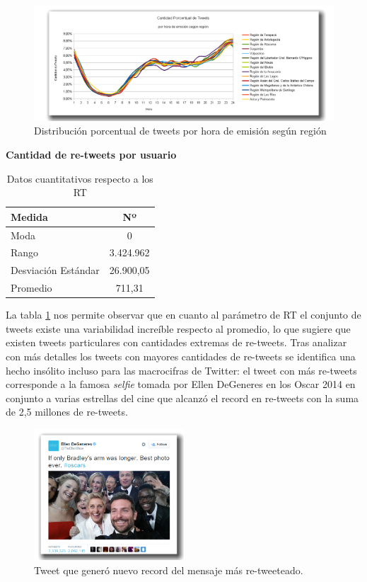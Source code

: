 \begin{figure}[H]
	\centering
	\includegraphics[width=1\textwidth]{imgs/cantidad_porcentual_de_tweets_por_hora_y_regiones.png}
	\caption{Distribución porcentual de tweets por hora de emisión según región}
	\label{fig:tweets_porcentual_por_hora_por_region}
\end{figure}



\textbf{Cantidad de re-tweets por usuario} \\

\begin{table}[H]
	\centering
	\begin{tabular}{| l | c |}
		\hline
		Medida   & Nº\\ \hline 
		Moda    & 0 \\ \hline
		Rango    & 3.424.962 \\ \hline
		Desviación Estándar    & 26.900,05 \\ \hline
		Promedio   & 711,31 \\ \hline
	\end{tabular}
	\caption {Datos cuantitativos respecto a los RT}
	\label{resumen_rt}
\end{table}

La tabla \ref{resumen_rt} nos permite observar que en cuanto al parámetro de RT el conjunto de tweets existe una variabilidad increíble respecto al promedio, lo que sugiere que existen tweets particulares con cantidades extremas de re-tweets. Tras analizar con más detalles los tweets con mayores cantidades de re-tweets se identifica una hecho insólito incluso para las macrocifras de Twitter: el tweet con más re-tweets corresponde a la famosa \emph{selfie} tomada por Ellen DeGeneres en los Oscar 2014 en conjunto a varias estrellas del cine que alcanzó el record en re-tweets con la suma de 2,5 millones de re-tweets.

\begin{figure}[H]
	\centering
	\includegraphics[width=0.5\textwidth]{imgs/ellen_selfie.png}
	\caption{Tweet que generó nuevo record del mensaje más re-tweeteado.}
	\label{fig:ellen_selfie}
\end{figure}

